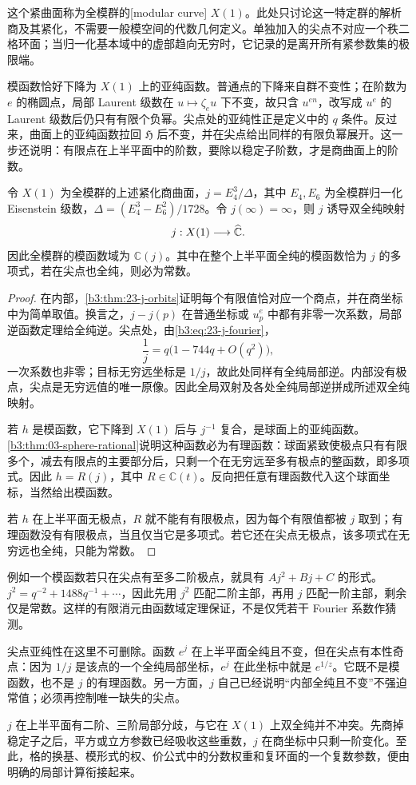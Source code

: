这个紧曲面称为全模群的[modular curve] \(X(1)\)。此处只讨论这一特定群的解析商及其紧化，不需要一般模空间的代数几何定义。单独加入的尖点不对应一个秩二格环面；当归一化基本域中的虚部趋向无穷时，它记录的是离开所有紧参数集的极限端。

\ProseParagraphBreak
模函数恰好下降为 \(X(1)\) 上的亚纯函数。普通点的下降来自群不变性；在阶数为 \(e\) 的椭圆点，局部 Laurent 级数在 \(u\mapsto\zeta_eu\) 下不变，故只含 \(u^{en}\)，改写成 \(u^e\) 的 Laurent 级数后仍只有有限个负幂。尖点处的亚纯性正是定义中的 \(q\) 条件。反过来，曲面上的亚纯函数拉回 \(\mathfrak H\) 后不变，并在尖点给出同样的有限负幂展开。这一步还说明：有限点在上半平面中的阶数，要除以稳定子阶数，才是商曲面上的阶数。

\begin{theorem}[模曲线的球面坐标]\label{b3:thm:23-j-sphere}
令 \(X(1)\) 为全模群的上述紧化商曲面，\(j=E_4^3/\Delta\)，其中 \(E_4,E_6\) 为全模群归一化 Eisenstein 级数，\(\Delta=(E_4^3-E_6^2)/1728\)。令 \(j(\infty)=\infty\)，则 \(j\) 诱导双全纯映射
\[
 j:X(1)\longrightarrow\widehat{\mathbb C\kern0pt}.
\]
因此全模群的模函数域为 \(\mathbb C(j)\)。其中在整个上半平面全纯的模函数恰为 \(j\) 的多项式，若在尖点也全纯，则必为常数。
\end{theorem}
\begin{proof}
在内部，\cref{b3:thm:23-j-orbits}证明每个有限值恰对应一个商点，并在商坐标中为简单取值。换言之，\(j-j(p)\) 在普通坐标或 \(u_p^e\) 中都有非零一次系数，局部逆函数定理给全纯逆。尖点处，由\eqref{b3:eq:23-j-fourier}，
\[
 \frac1j=q\bigl(1-744q+O(q^2)\bigr),
\]
一次系数也非零；目标无穷远坐标是 \(1/j\)，故此处同样有全纯局部逆。内部没有极点，尖点是无穷远值的唯一原像。因此全局双射及各处全纯局部逆拼成所述双全纯映射。

若 \(h\) 是模函数，它下降到 \(X(1)\) 后与 \(j^{-1}\) 复合，是球面上的亚纯函数。\cref{b3:thm:03-sphere-rational}说明这种函数必为有理函数：球面紧致使极点只有有限多个，减去有限点的主要部分后，只剩一个在无穷远至多有极点的整函数，即多项式。因此 \(h=R(j)\)，其中 \(R\in\mathbb C(t)\)。反向把任意有理函数代入这个球面坐标，当然给出模函数。

若 \(h\) 在上半平面无极点，\(R\) 就不能有有限极点，因为每个有限值都被 \(j\) 取到；有理函数没有有限极点，当且仅当它是多项式。若它还在尖点无极点，该多项式在无穷远也全纯，只能为常数。
\end{proof}

\ProseParagraphBreak
例如一个模函数若只在尖点有至多二阶极点，就具有 \(Aj^2+Bj+C\) 的形式。\(j^2=q^{-2}+1488q^{-1}+\cdots\)，因此先用 \(j^2\) 匹配二阶主部，再用 \(j\) 匹配一阶主部，剩余仅是常数。这样的有限消元由函数域定理保证，不是仅凭若干 Fourier 系数作猜测。

\ProseParagraphBreak
尖点亚纯性在这里不可删除。函数 \(e^j\) 在上半平面全纯且不变，但在尖点有本性奇点：因为 \(1/j\) 是该点的一个全纯局部坐标，\(e^j\) 在此坐标中就是 \(e^{1/z}\)。它既不是模函数，也不是 \(j\) 的有理函数。另一方面，\(j\) 自己已经说明“内部全纯且不变”不强迫常值；必须再控制唯一缺失的尖点。

\ProseParagraphBreak
\(j\) 在上半平面有二阶、三阶局部分歧，与它在 \(X(1)\) 上双全纯并不冲突。先商掉稳定子之后，平方或立方参数已经吸收这些重数，\(j\) 在商坐标中只剩一阶变化。至此，格的换基、模形式的权、价公式中的分数权重和复环面的一个复数参数，便由明确的局部计算衔接起来。

